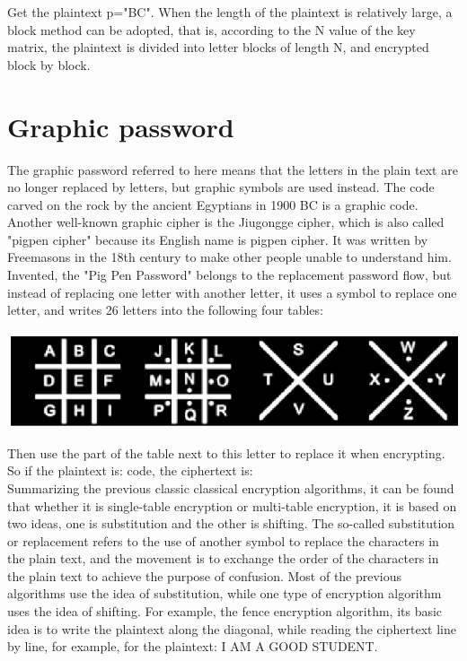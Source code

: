 \documentclass{article}
\begin{document}
Get the plaintext p="BC". When the length of the plaintext is relatively large, a block method can be adopted, that is, according to the N value of the key matrix, the plaintext is divided into letter blocks of length N, and encrypted block by block.\\


\section{Graphic password}


The graphic password referred to here means that the letters in the plain text are no longer replaced by letters, but graphic symbols are used instead. The code carved on the rock by the ancient Egyptians in 1900 BC is a graphic code. Another well-known graphic cipher is the Jiugongge cipher, which is also called "pigpen cipher" because its English name is pigpen cipher. It was written by Freemasons in the 18th century to make other people unable to understand him. Invented, the "Pig Pen Password" belongs to the replacement password flow, but instead of replacing one letter with another letter, it uses a symbol to replace one letter, and writes 26 letters into the following four tables:\\

\begin{center}
\centering\includegraphics{1.jpg}
\end{center}

Then use the part of the table next to this letter to replace it when encrypting.\\

So if the plaintext is: code, the ciphertext is:\\

Summarizing the previous classic classical encryption algorithms, it can be found that whether it is single-table encryption or multi-table encryption, it is based on two ideas, one is substitution and the other is shifting. The so-called substitution or replacement refers to the use of another symbol to replace the characters in the plain text, and the movement is to exchange the order of the characters in the plain text to achieve the purpose of confusion. Most of the previous algorithms use the idea of ​​substitution, while one type of encryption algorithm uses the idea of ​​shifting. For example, the fence encryption algorithm, its basic idea is to write the plaintext along the diagonal, while reading the ciphertext line by line, for example, for the plaintext: I AM A GOOD STUDENT.\\
\end{document}
